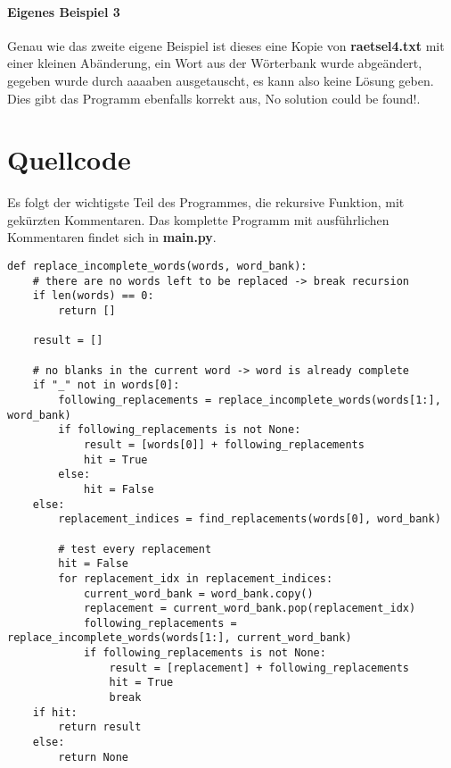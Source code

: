 \documentclass[a4paper,10pt,ngerman]{scrartcl}
\begin{document}
\paragraph{Eigenes Beispiel 3}
Genau wie das zweite eigene Beispiel ist dieses eine Kopie von \textbf{raetsel4.txt} mit einer kleinen Abänderung, ein Wort aus der Wörterbank wurde abgeändert, \glqq gegeben\grqq{} wurde durch \glqq aaaaben\grqq{} ausgetauscht, es kann also keine Lösung geben. Dies gibt das Programm ebenfalls korrekt aus, \glqq No solution could be found!\grqq{}.

\section{Quellcode}

Es folgt der wichtigste Teil des Programmes, die rekursive Funktion, mit gekürzten Kommentaren. Das komplette Programm mit ausführlichen Kommentaren findet sich in \textbf{main.py}.
\begin{lstlisting}
def replace_incomplete_words(words, word_bank):
    # there are no words left to be replaced -> break recursion
    if len(words) == 0:
        return []

    result = []

    # no blanks in the current word -> word is already complete
    if "_" not in words[0]:
        following_replacements = replace_incomplete_words(words[1:], word_bank)
        if following_replacements is not None:
            result = [words[0]] + following_replacements
            hit = True
        else:
            hit = False
    else:
        replacement_indices = find_replacements(words[0], word_bank)

        # test every replacement
        hit = False
        for replacement_idx in replacement_indices:
            current_word_bank = word_bank.copy()
            replacement = current_word_bank.pop(replacement_idx)
            following_replacements = replace_incomplete_words(words[1:], current_word_bank)
            if following_replacements is not None:
                result = [replacement] + following_replacements
                hit = True
                break
    if hit:
        return result
    else:
        return None
\end{lstlisting}
\end{document}
